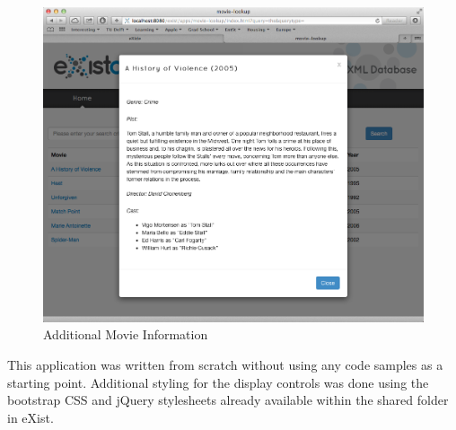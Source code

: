 \documentclass[MoviesApp.tex]{subfiles}
\begin{document}
\begin{figure} [H]
	\centering
	\includegraphics[width=1\textwidth]{./Figures/MovieAppSelected.png}
	\caption{Additional Movie Information}
	\label{fig:movieappselected}
\end{figure}

This application was written from scratch without using any code samples as a starting point. Additional styling for the display controls was done using the bootstrap CSS and jQuery stylesheets already available within the shared folder in eXist.
\end{document}
